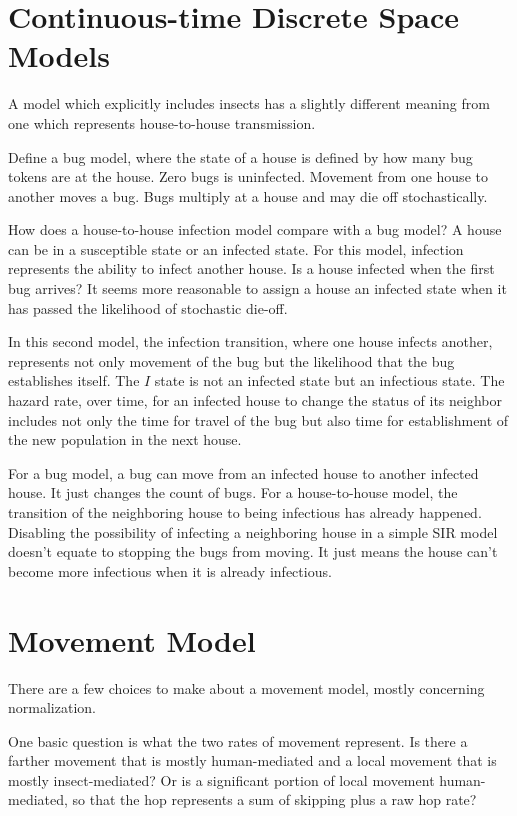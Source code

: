 \documentclass{article}
\begin{document}
\section{Continuous-time Discrete Space Models}
A model which explicitly includes insects has a slightly
different meaning from one which represents house-to-house
transmission.

Define a bug model, where the state of a house is defined
by how many bug tokens are at the house. Zero bugs is uninfected.
Movement from one house to another moves a bug. Bugs multiply
at a house and may die off stochastically.

How does a house-to-house infection model compare with a bug
model? A house can be in a susceptible state or an infected
state. For this model, infection represents the ability to
infect another house. Is a house infected when the first bug
arrives? It seems more reasonable to assign a house an
infected state when it has passed the likelihood of stochastic
die-off.

In this second model, the infection transition, where one
house infects another, represents not only movement
of the bug but the likelihood that the bug establishes itself.
The $I$ state is not an infected state but an infectious state.
The hazard rate, over time, for an infected house to change
the status of its neighbor includes not only the time
for travel of the bug but also time for establishment of the
new population in the next house.

For a bug model, a bug can move from an infected house to
another infected house. It just changes the count of bugs.
For a house-to-house model, the transition of the neighboring
house to being infectious has already happened.
Disabling the possibility of infecting a neighboring house
in a simple SIR model doesn't equate to stopping the bugs
from moving. It just means the house can't become more infectious
when it is already infectious.


\section{Movement Model}
There are a few choices to make about a movement model, mostly
concerning normalization.

One basic question is what the two rates of movement represent.
Is there a farther movement that is mostly human-mediated 
and a local movement that is mostly insect-mediated?
Or is a significant portion of local movement human-mediated,
so that the hop represents a sum of skipping plus a raw hop rate?
\end{document}
